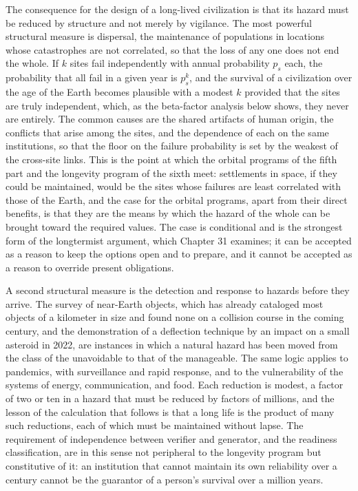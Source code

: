 The consequence for the design of a long-lived civilization is that its hazard must be reduced by structure and not merely by vigilance. The most powerful structural measure is dispersal, the maintenance of populations in locations whose catastrophes are not correlated, so that the loss of any one does not end the whole. If $k$ sites fail independently with annual probability $p_s$ each, the probability that all fail in a given year is $p_s^k$, and the survival of a civilization over the age of the Earth becomes plausible with a modest $k$ provided that the sites are truly independent, which, as the beta-factor analysis below shows, they never are entirely. The common causes are the shared artifacts of human origin, the conflicts that arise among the sites, and the dependence of each on the same institutions, so that the floor on the failure probability is set by the weakest of the cross-site links. This is the point at which the orbital programs of the fifth part and the longevity program of the sixth meet: settlements in space, if they could be maintained, would be the sites whose failures are least correlated with those of the Earth, and the case for the orbital programs, apart from their direct benefits, is that they are the means by which the hazard of the whole can be brought toward the required values. The case is conditional and is the strongest form of the longtermist argument, which Chapter 31 examines; it can be accepted as a reason to keep the options open and to prepare, and it cannot be accepted as a reason to override present obligations.

A second structural measure is the detection and response to hazards before they arrive. The survey of near-Earth objects, which has already cataloged most objects of a kilometer in size and found none on a collision course in the coming century, and the demonstration of a deflection technique by an impact on a small asteroid in 2022, are instances in which a natural hazard has been moved from the class of the unavoidable to that of the manageable. The same logic applies to pandemics, with surveillance and rapid response, and to the vulnerability of the systems of energy, communication, and food. Each reduction is modest, a factor of two or ten in a hazard that must be reduced by factors of millions, and the lesson of the calculation that follows is that a long life is the product of many such reductions, each of which must be maintained without lapse. The requirement of independence between verifier and generator, and the readiness classification, are in this sense not peripheral to the longevity program but constitutive of it: an institution that cannot maintain its own reliability over a century cannot be the guarantor of a person's survival over a million years.

